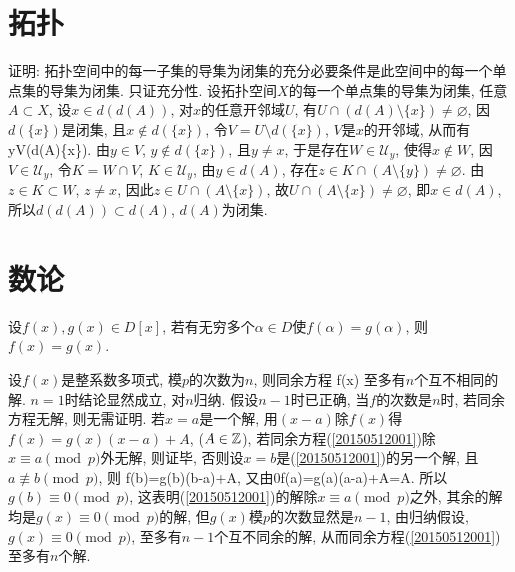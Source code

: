 
\section{拓扑}
证明: 拓扑空间中的每一子集的导集为闭集的充分必要条件是此空间中的每一个单点集的导集为闭集.
\et
\ba
只证充分性. 设拓扑空间$X$的每一个单点集的导集为闭集, 任意$A\subset X$, 设$x\in d(d(A))$, 对$x$的任意开邻域$U$,
有$U\cap(d(A)\setminus\{x\})\ne\varnothing$, 因$d(\{x\})$是闭集, 且$x\not\in d(\{x\})$, 令$V=U\setminus d(\{x\})$, 
$V$是$x$的开邻域, 从而有
\bee
y\in V\cap(d(A)\setminus\{x\}).
\eee
由$y\in V$, $y\not\in d(\{x\})$, 且$y\ne x$, 于是存在$W\in\mathscr{U}_y$, 使得$x\not\in W$, 因$V\in\mathscr{U}_y$, 
令$K=W\cap V$, $K\in\mathscr{U}_y$, 由$y\in d(A)$, 存在$z\in K\cap(A\setminus\{y\})\ne\varnothing$.
由$z\in K\subset W$, $z\ne x$, 因此$z\in U\cap(A\setminus\{x\})$, 故$U\cap(A\setminus\{x\})\ne\varnothing$,
即$x\in d(A)$, 所以$d(d(A))\subset d(A)$, $d(A)$为闭集.
\ea


\section{数论}
设$f(x),g(x)\in D[x]$, 若有无穷多个$\alpha\in D$使$f(\alpha)=g(\alpha)$, 则$f(x)=g(x)$.
\et

设$f(x)$是整系数多项式, 模$p$的次数为$n$, 则同余方程
\be\label{20150512001}
f(x)
\ee
至多有$n$个互不相同的解.
\et
\ba
$n=1$时结论显然成立, 对$n$归纳. 假设$n-1$时已正确, 当$f$的次数是$n$时, 若同余方程无解, 则无需证明.
若$x=a$是一个解, 用$(x-a)$除$f(x)$得$f(x)=g(x)(x-a)+A$, ($A\in\mathbb{Z}$), 若同余方程(\ref{20150512001})除$x\equiv a\pmod{p}$外无解, 则证毕, 
否则设$x=b$是(\ref{20150512001})的另一个解, 且$a\not\equiv b\pmod{p}$, 则
\equiv f(b)=g(b)(b-a)+A, \textrm{又由}0\equiv f(a)=g(a)(a-a)+A=A.
\eee
所以$g(b)\equiv0\pmod{p}$, 这表明(\ref{20150512001})的解除$x\equiv a\pmod{p}$之外, 其余的解均是$g(x)\equiv0\pmod{p}$的解, 
但$g(x)$模$p$的次数显然是$n-1$, 由归纳假设, $g(x)\equiv 0\pmod{p}$, 至多有$n-1$个互不同余的解, 从而同余方程(\ref{20150512001})至多有$n$个解.
\ea

